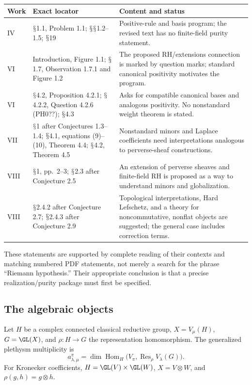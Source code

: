 \documentclass[11pt,a4paper]{article}
\newcommand{\Hom}{\operatorname{Hom}}\newcommand{\Spec}{\operatorname{Spec}}\newcommand{\Tr}{\operatorname{Tr}}\newcommand{\rank}{\operatorname{rank}}\newcommand{\Sym}{\operatorname{Sym}}\newcommand{\Res}{\operatorname{Res}}\newcommand{\IC}{\operatorname{IC}}\newcommand{\Gr}{\operatorname{Gr}}\newcommand{\Rep}{\operatorname{Rep}}\newcommand{\Frob}{\operatorname{Frob}}\newcommand{\End}{\operatorname{End}}
\renewcommand{\S}{\ensuremath{\mathsection}}
\theoremstyle{named}\newtheorem{finding}{Finding}[section]
\theoremstyle{definition}\newtheorem{definition}[finding]{Definition}
\theoremstyle{remark}\newtheorem{remark}[finding]{Remark}
\begin{document}
{\small\begin{longtable}{p{.13\linewidth}p{.35\linewidth}p{.44\linewidth}}
\toprule Work&Exact locator&Content and status\\\midrule\endhead
IV&\S1.1, Problem 1.1; \S\S1.2--1.5; \S19&Positive-rule and basis program; the revised text has no finite-field purity statement.\\
VI&Introduction, Figure 1.1; \S1.7, Observation 1.7.1 and Figure 1.2&The proposed RH/extensions connection is marked by question marks; standard canonical positivity motivates the program.\\
VI&\S4.2, Proposition 4.2.1; \S4.2.2, Question 4.2.6 (PH0??); \S4.3&Asks for compatible canonical bases and analogous positivity. No nonstandard weight theorem is stated.\\
VII&\S1 after Conjectures 1.3--1.4; \S4.1, equations (9)--(10), Theorem 4.4; \S4.2, Theorem 4.5&Nonstandard minors and Laplace coefficients need interpretations analogous to perverse-sheaf constructions.\\
VIII&\S1, pp.~2--3; \S2.3 after Conjecture 2.5&An extension of perverse sheaves and finite-field RH is proposed as a way to understand minors and globalization.\\
VIII&\S2.4.2 after Conjecture 2.7; \S2.4.3 after Conjecture 2.9&Topological interpretations, Hard Lefschetz, and a theory for noncommutative, nonflat objects are suggested; the general case includes correction terms.\\\bottomrule
\end{longtable}}
These statements are supported by complete reading of their contexts and matching numbered PDF statements, not merely a search for the phrase ``Riemann hypothesis.'' Their appropriate conclusion is that a precise realization/purity package must first be specified.

\subsection{The algebraic objects}
Let $H$ be a complex connected classical reductive group, $X=V_\mu(H)$, $G=\GL(X)$, and $\rho:H\to G$ the representation homomorphism. The generalized plethysm multiplicity is
\begin{equation}\label{eq:plethysm}
a_{\lambda,\mu}^{\pi}=\dim\Hom_H\bigl(V_\pi,\Res_\rho V_\lambda(G)\bigr).
\end{equation}
For Kronecker coefficients, $H=\GL(V)\times\GL(W)$, $X=V\otimes W$, and $\rho(g,h)=g\otimes h$.
\end{document}
